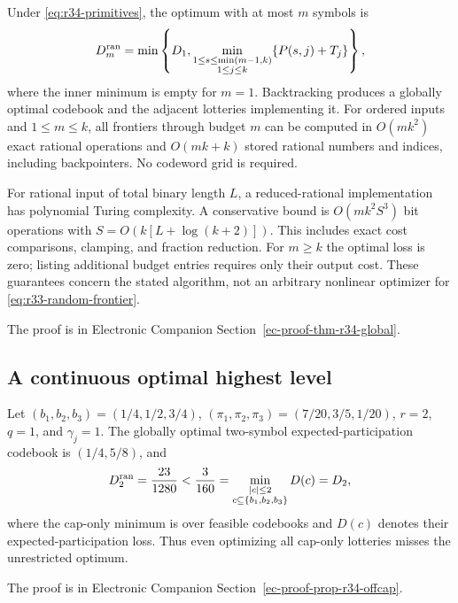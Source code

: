 \begin{theorem}\label{thm:r34-global}
Under \eqref{eq:r34-primitives}, the optimum with at most $m$ symbols is
\begin{equation}\label{eq:r34-frontier}
 D_m^{\rm ran}=\min\left\{D_1,
 \min_{\substack{1\leq s\leq\min(m-1,k)\\1\leq j\leq k}}
       \{P(s,j)+T_j\}\right\},
\end{equation}
where the inner minimum is empty for $m=1$. Backtracking produces a globally optimal codebook and the adjacent lotteries implementing it. For ordered inputs and $1\leq m\leq k$, all frontiers through budget $m$ can be computed in $O(mk^2)$ exact rational operations and $O(mk+k)$ stored rational numbers and indices, including backpointers. No codeword grid is required.

For rational input of total binary length $L$, a reduced-rational implementation has polynomial Turing complexity. A conservative bound is $O(mk^2 S^3)$ bit operations with $S=O(k[L+\log(k+2)])$. This includes exact cost comparisons, clamping, and fraction reduction. For $m\geq k$ the optimal loss is zero; listing additional budget entries requires only their output cost. These guarantees concern the stated algorithm, not an arbitrary nonlinear optimizer for \eqref{eq:r33-random-frontier}.
\end{theorem}
\noindent The proof is in Electronic Companion Section~\ref{ec-proof-thm-r34-global}.


\subsection{A continuous optimal highest level}
\begin{proposition}\label{prop:r34-offcap}
Let $(b_1,b_2,b_3)=(1/4,1/2,3/4)$, $(\pi_1,\pi_2,\pi_3)=(7/20,3/5,1/20)$, $r=2$, $q=1$, and $\gamma_j=1$. The globally optimal two-symbol expected-participation codebook is $(1/4,5/8)$, and
\begin{equation}\label{eq:r34-offcap}
 D_2^{\rm ran}=\frac{23}{1280}
 <\frac{3}{160}
 =\min_{\substack{|c|\leq2\\c\subseteq\{b_1,b_2,b_3\}}}D(c)
 =D_2,
\end{equation}
where the cap-only minimum is over feasible codebooks and $D(c)$ denotes their expected-participation loss. Thus even optimizing all cap-only lotteries misses the unrestricted optimum.
\end{proposition}
\noindent The proof is in Electronic Companion Section~\ref{ec-proof-prop-r34-offcap}.


